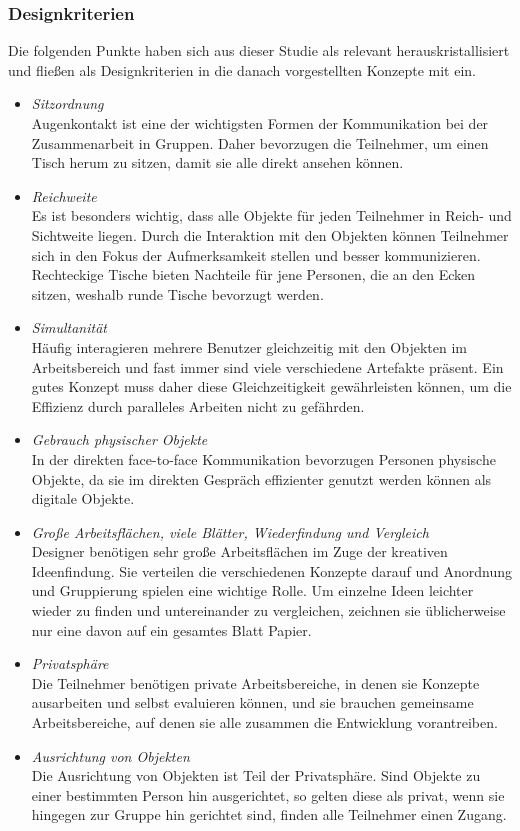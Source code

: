 \subsubsection{Designkriterien} 

Die folgenden Punkte haben sich aus dieser Studie als relevant herauskristallisiert und fließen als Designkriterien in die danach vorgestellten Konzepte mit ein.

\begin{itemize} 
	\item{\emph{Sitzordnung}}\\
	Augenkontakt ist eine der wichtigsten Formen der Kommunikation bei der Zusammenarbeit in Gruppen. Daher bevorzugen die Teilnehmer, um einen Tisch herum zu sitzen, damit sie alle direkt ansehen können.
	\item{\emph{Reichweite}}\\
	Es ist besonders wichtig, dass alle Objekte für jeden Teilnehmer in Reich- und Sichtweite liegen. Durch die Interaktion mit den Objekten können Teilnehmer sich in den Fokus der Aufmerksamkeit stellen und besser kommunizieren. Rechteckige Tische bieten Nachteile für jene Personen, die an den Ecken sitzen, weshalb runde Tische bevorzugt werden.
	\item{\emph{Simultanität}}\\
	Häufig interagieren mehrere Benutzer gleichzeitig mit den Objekten im Arbeitsbereich und fast immer sind viele verschiedene Artefakte präsent. Ein gutes Konzept muss daher diese Gleichzeitigkeit gewährleisten können, um die Effizienz durch paralleles Arbeiten nicht zu gefährden.
	\item{\emph{Gebrauch physischer Objekte}}\\
	In der direkten face-to-face Kommunikation bevorzugen Personen physische Objekte, da sie im direkten Gespräch effizienter genutzt werden können als digitale Objekte.
	\item{\emph{Große Arbeitsflächen, viele Blätter, Wiederfindung und Vergleich}}\\
	Designer benötigen sehr große Arbeitsflächen im Zuge der kreativen Ideenfindung. Sie verteilen die verschiedenen Konzepte darauf und Anordnung und Gruppierung spielen eine wichtige Rolle. Um einzelne Ideen leichter wieder zu finden und untereinander zu vergleichen, zeichnen sie üblicherweise nur eine davon auf ein gesamtes Blatt Papier.
	\item{\emph{Privatsphäre}}\\
	Die Teilnehmer benötigen private Arbeitsbereiche, in denen sie Konzepte ausarbeiten und selbst evaluieren können, und sie brauchen gemeinsame Arbeitsbereiche, auf denen sie alle zusammen die Entwicklung vorantreiben.
	\item{\emph{Ausrichtung von Objekten}}\\
	Die Ausrichtung von Objekten ist Teil der Privatsphäre. Sind Objekte zu einer bestimmten Person hin ausgerichtet, so gelten diese als privat, wenn sie hingegen zur Gruppe hin gerichtet sind, finden alle Teilnehmer einen Zugang.
\end{itemize}

